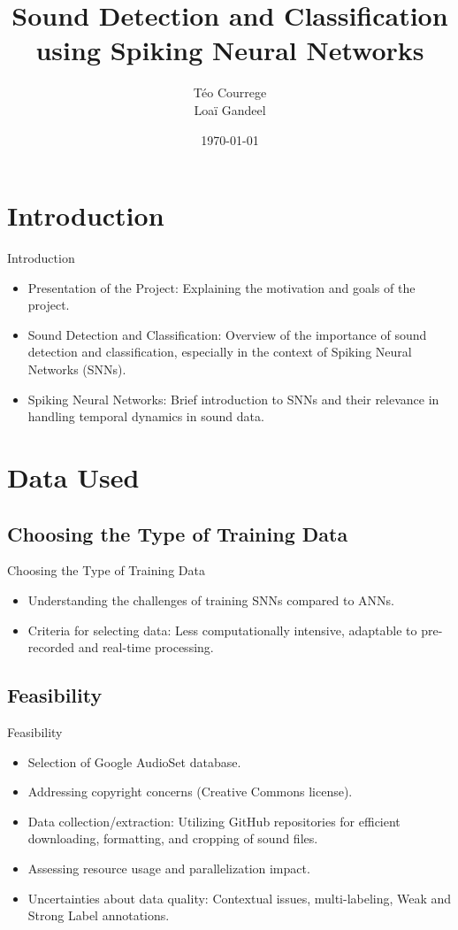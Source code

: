 \documentclass[aspectratio=169, 11pt]{beamer}
\title[Sound Detection and Classification]{\textbf{Sound Detection and Classification}\\ using Spiking Neural Networks}
\author[T. Courrege, L. Gandeel]{Téo Courrege\\Loaï Gandeel}
\date{\today}
\begin{document}
\begin{frame}[plain]
  \titlepage
\end{frame}

\section{Introduction}

\begin{frame}{Introduction}
  \begin{itemize}
    \item Presentation of the Project: Explaining the motivation and goals of the project.
    \item Sound Detection and Classification: Overview of the importance of sound detection and classification, especially in the context of Spiking Neural Networks (SNNs).
    \item Spiking Neural Networks: Brief introduction to SNNs and their relevance in handling temporal dynamics in sound data.
  \end{itemize}
\end{frame}

\section{Data Used}

\subsection{Choosing the Type of Training Data}

\begin{frame}{Choosing the Type of Training Data}
  \begin{itemize}
    \item Understanding the challenges of training SNNs compared to ANNs.
    \item Criteria for selecting data: Less computationally intensive, adaptable to pre-recorded and real-time processing.
  \end{itemize}
\end{frame}

\subsection{Feasibility}

\begin{frame}{Feasibility}
  \begin{itemize}
    \item Selection of Google AudioSet database.
    \item Addressing copyright concerns (Creative Commons license).
    \item Data collection/extraction: Utilizing GitHub repositories for efficient downloading, formatting, and cropping of sound files.
    \item Assessing resource usage and parallelization impact.
    \item Uncertainties about data quality: Contextual issues, multi-labeling, Weak and Strong Label annotations.
  \end{itemize}
\end{frame}
\end{document}

